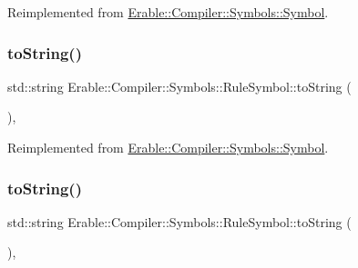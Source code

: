 Reimplemented from \mbox{\hyperlink{class_erable_1_1_compiler_1_1_symbols_1_1_symbol_a108a4a3e9b9a2785f14ed580e813a52a}{Erable\+::\+Compiler\+::\+Symbols\+::\+Symbol}}.

\mbox{\label{class_erable_1_1_compiler_1_1_symbols_1_1_rule_symbol_a4fc1d4bfd6e2587308dc274fa0934511}} 
\subsubsection{\texorpdfstring{toString()}{toString()}\hspace{0.1cm}{\footnotesize\ttfamily [1/2]}}
{\footnotesize\ttfamily std\+::string Erable\+::\+Compiler\+::\+Symbols\+::\+Rule\+Symbol\+::to\+String (\begin{DoxyParamCaption}{ }\end{DoxyParamCaption})\hspace{0.3cm}{\ttfamily [override]}, {\ttfamily [virtual]}}



Reimplemented from \mbox{\hyperlink{class_erable_1_1_compiler_1_1_symbols_1_1_symbol_af5ccb3fb3201fd88ab6ce0e495416c82}{Erable\+::\+Compiler\+::\+Symbols\+::\+Symbol}}.

\mbox{\label{class_erable_1_1_compiler_1_1_symbols_1_1_rule_symbol_a4fc1d4bfd6e2587308dc274fa0934511}} 
\subsubsection{\texorpdfstring{toString()}{toString()}\hspace{0.1cm}{\footnotesize\ttfamily [2/2]}}
{\footnotesize\ttfamily std\+::string Erable\+::\+Compiler\+::\+Symbols\+::\+Rule\+Symbol\+::to\+String (\begin{DoxyParamCaption}{ }\end{DoxyParamCaption})\hspace{0.3cm}{\ttfamily [override]}, {\ttfamily [virtual]}}



